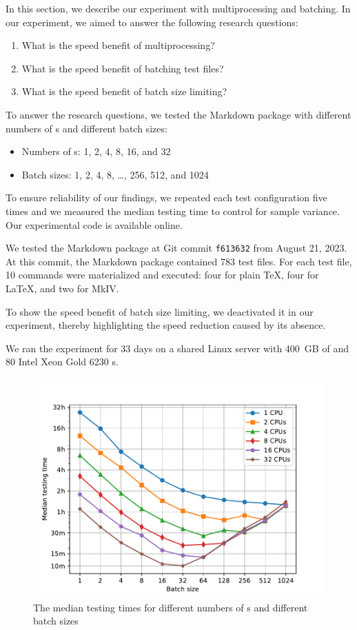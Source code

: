 \documentclass[final]{ltugboat}
\begin{document}
In this section, we describe our experiment with multiprocessing and batching. In our experiment, we aimed to answer the following research questions:
\begin{enumerate}
\item What is the speed benefit of multiprocessing?
\item What is the speed benefit of batching test files?
\item What is the speed benefit of batch size limiting?
\end{enumerate}

To answer the research questions, we tested the Markdown package with different numbers of s and different batch sizes:
\begin{itemize}
\item Numbers of s: 1, 2, 4, 8, 16, and 32
\item Batch sizes: 1, 2, 4, 8, \ldots, 256, 512, and 1024
\end{itemize}
To ensure reliability of our findings, we repeated each test configuration five times and we measured the median testing time to control for sample variance. Our experimental code is available online.~\cite{starynovotny2023measure}

We tested the Markdown package at Git commit \texttt{f613632} from August 21, 2023. At this commit, the Markdown package contained 783 test files. For each test file, 10 commands were materialized and executed: four for plain \TeX, four for \LaTeX, and two for  MkIV.

To show the speed benefit of batch size limiting, we deactivated it in our experiment, thereby highlighting the speed reduction caused by its absence.

We ran the experiment for 33 days on a shared Linux server with 400~GB of  and 80 Intel Xeon Gold 6230 s.

\begin{figure}
\includegraphics[trim={0.5cm 0.3cm 1.6cm 1.4cm}, clip, width=\linewidth]{images/speed-tests}
\caption{The median testing times for different numbers of s and different batch sizes}
\label{fig:results}
\end{figure}
\end{document}

